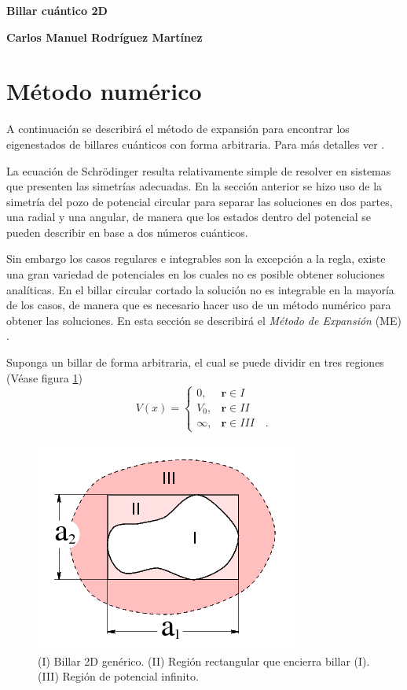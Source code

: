 \documentclass[letterpaper,11pt]{article}
\renewcommand{\vec}[1]{\mathbf{#1}}
\begin{document}
\begin{center}
{\bf \Large Billar cuántico 2D} 
\end{center}

\noindent
{\bf \large Carlos Manuel Rodríguez Martínez} \hspace{5.2cm}

\smallskip


\section{Método numérico}
A continuación se describirá el método de expansión para encontrar los eigenestados de billares cuánticos con forma arbitraria. Para más detalles ver \cite{EM}.

La ecuación de Schrödinger resulta relativamente simple de resolver en sistemas que presenten las simetrías adecuadas. En la sección anterior se hizo uso de la simetría del pozo de potencial circular para separar las soluciones en dos partes, una radial y una angular, de manera que los estados dentro del potencial se pueden describir en base a dos números cuánticos.

Sin embargo los casos regulares e integrables son la excepción a la regla, existe una gran variedad de potenciales en los cuales no es posible obtener soluciones analíticas. En el billar circular cortado la solución no es integrable en la mayoría de los casos, de manera que es necesario hacer uso de un método numérico para obtener las soluciones. En esta sección se describirá el \textit{Método de Expansión} (ME) \cite{EM}.

Suponga un billar de forma arbitraria, el cual se puede dividir en tres regiones (Véase figura \ref{fig:regionesbillar})
\[
	V(x) =
	\begin{cases}
	0, & \vec{r} \in I \\
	V_0, & \vec{r} \in II \\
	\infty, & \vec{r} \in III \quad .
	\end{cases}
\]

\begin{figure}[h!]
\centering
\includegraphics[scale=0.45]{img/bill_cuantico_general}
\caption{(I) Billar 2D genérico. (II) Región rectangular que encierra billar (I). (III) Región de potencial infinito.}
\label{fig:regionesbillar}
\end{figure}
\end{document}
